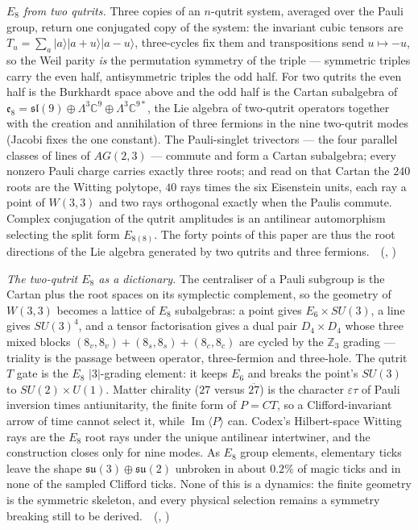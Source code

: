 \emph{$E_8$ from two qutrits.} Three copies of an $n$-qutrit system, averaged over the Pauli group, return one conjugated copy of the
system: the invariant cubic tensors are $T_u=\sum_a|a\rangle|a+u\rangle|a-u\rangle$, three-cycles fix them and transpositions send $u\mapsto-u$,
so the Weil parity \emph{is} the permutation symmetry of the triple --- symmetric triples carry the even half, antisymmetric triples the
odd half. For two qutrits the even half is the Burkhardt space above and the odd half is the Cartan subalgebra of
$\mathfrak e_8=\mathfrak{sl}(9)\oplus\Lambda^3\mathbb C^9\oplus\Lambda^3\mathbb C^{9*}$, the Lie algebra of two-qutrit operators together with the creation and
annihilation of three fermions in the nine two-qutrit modes (Jacobi fixes the one constant). The Pauli-singlet trivectors --- the four
parallel classes of lines of $AG(2,3)$ --- commute and form a Cartan subalgebra; every nonzero Pauli charge carries exactly three roots; and
read on that Cartan the $240$ roots are the Witting polytope, $40$ rays times the six Eisenstein units, each ray a point of $W(3,3)$ and two
rays orthogonal exactly when the Paulis commute. Complex conjugation of the qutrit amplitudes is an antilinear automorphism selecting the
split form $E_{8(8)}$. The forty points of this paper are thus the root directions of the Lie algebra generated by two qutrits and three
fermions.
\tierT\,\tierC\ (, )

\emph{The two-qutrit $E_8$ as a dictionary.} The centraliser of a Pauli subgroup is the Cartan plus the root spaces on its symplectic
complement, so the geometry of $W(3,3)$ becomes a lattice of $E_8$ subalgebras: a point gives $E_6\times SU(3)$, a line gives $SU(3)^4$,
and a tensor factorisation gives a dual pair $D_4\times D_4$ whose three mixed blocks $(8_v,8_v)+(8_s,8_s)+(8_c,8_c)$ are cycled by the
$\mathbb Z_3$ grading --- triality is the passage between operator, three-fermion and three-hole. The qutrit $T$ gate is the $E_8$
$|3|$-grading element: it keeps $E_6$ and breaks the point's $SU(3)$ to $SU(2)\times U(1)$. Matter chirality ($27$ versus $\overline{27}$) is
the character $\varepsilon\tau$ of Pauli inversion times antiunitarity, the finite form of $P=CT$, so a Clifford-invariant arrow of time cannot
select it, while $\operatorname{Im}\langle P\rangle$ can. Codex's Hilbert-space Witting rays are the $E_8$ root rays under the unique antilinear
intertwiner, and the construction closes only for nine modes. As $E_8$ group elements, elementary ticks leave the shape
$\mathfrak{su}(3)\oplus\mathfrak{su}(2)$ unbroken in about $0.2\%$ of magic ticks and in none of the sampled Clifford ticks. None of this is a
dynamics: the finite geometry is the symmetric skeleton, and every physical selection remains a symmetry breaking still to be derived.
\tierT\,\tierC\ (, )

